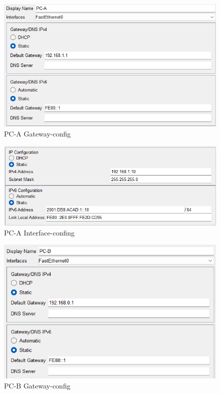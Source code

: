 \documentclass[a4paper]{article}
\begin{document}
\begin{figure}[h]
	\centering
	\includegraphics[scale=0.3]{images/pc-a-gateway.png}
	\caption{PC-A Gateway-config}
\end{figure}
\begin{figure}[h]
	\centering
	\includegraphics[scale=0.3]{images/pc-a-fa.png}
	\caption{PC-A Interface-confing}
\end{figure}
\begin{figure}[h]
	\centering
	\includegraphics[scale=0.3]{images/pb-b-gateway.png}
	\caption{PC-B Gateway-config}
\end{figure}
\end{document}
